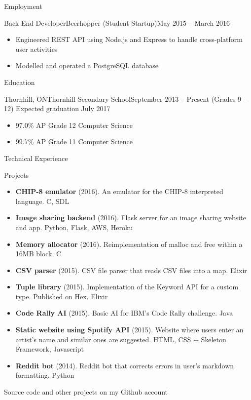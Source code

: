 \documentclass[]{mcdowellcv}
\begin{document}
	\makeheader

	\begin{cvsection}{Employment}
		\begin{cvsubsection}{Back End Developer}{Beerhopper (Student Startup)}{May 2015 -- March 2016}
			\begin{itemize}
				\item Engineered REST API using Node.js and Express to handle cross-platform user activities
				\item Modelled and operated a PostgreSQL database
			\end{itemize}
		\end{cvsubsection}
	\end{cvsection}

	\begin{cvsection}{Education}
		\begin{cvsubsection}{Thornhill, ON}{Thornhill Secondary School}{September 2013 -- Present (Grades 9 -- 12)}
            Expected graduation July 2017
			\begin{itemize}
				\item 97.0\% AP Grade 12 Computer Science
				\item 99.7\% AP Grade 11 Computer Science
			\end{itemize}
		\end{cvsubsection}
	\end{cvsection}

	\begin{cvsection}{Technical Experience}
		\begin{cvsubsection}{Projects}{}{}
			\begin{itemize}
                \item \textbf{CHIP-8 emulator} (2016). An emulator for the CHIP-8 interpreted language.  C, SDL
                \item \textbf{Image sharing backend} (2016). Flask server for an image sharing website and app.  Python, Flask, AWS, Heroku
				\item \textbf{Memory allocator} (2016). Reimplementation of malloc and free within a 16MB block.  C
				\item \textbf{CSV parser} (2015). CSV file parser that reads CSV files into a map.  Elixir
				\item \textbf{Tuple library} (2015). Implementation of the Keyword API for a custom type. Published on Hex.  Elixir
				\item \textbf{Code Rally AI} (2015). Basic AI for IBM's Code Rally challenge.  Java
				\item \textbf{Static website using Spotify API} (2015). Website where users enter an artist's name and similar ones are suggested.  HTML, CSS + Skeleton Framework, Javascript
				\item \textbf{Reddit bot} (2014). Reddit bot that corrects errors in user's markdown formatting.  Python
			\end{itemize}
            Source code and other projects on my Github account
		\end{cvsubsection}
	\end{cvsection}
\end{document}
